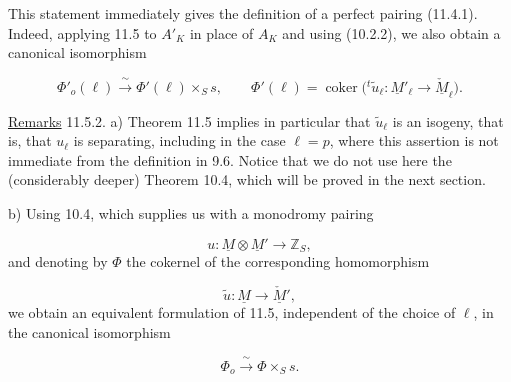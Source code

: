 This statement immediately gives the definition of a perfect pairing
(11.4.1). Indeed, applying 11.5 to $A'_K$ in place of $A_K$ and using
(10.2.2), we also obtain a canonical isomorphism

\begin{equation*}
\Phi'_o(\ell)\xrightarrow{\ \sim\ }\Phi'(\ell)\times_S s,
\qquad
\Phi'(\ell)=\operatorname{coker}\bigl(
 {}^t\!\widetilde u_\ell:\underline M'_\ell
 \longrightarrow\underline{\check M}_\ell\bigr).
\end{equation*}

\medskip
\noindent
\underline{Remarks} 11.5.2. a) Theorem 11.5 implies in particular that
$\widetilde u_\ell$ is an isogeny, that is, that $u_\ell$ is
separating, including in the case $\ell=p$, where this assertion is not
immediate from the definition in 9.6. Notice that we do not use here
the (considerably deeper) Theorem 10.4, which will be proved in the next
section.

\smallskip
\noindent
b) Using 10.4, which supplies us with a monodromy pairing

\begin{equation*}
u:\underline M\otimes\underline M'\longrightarrow\mathbb Z_S,
\end{equation*}
and denoting by $\Phi$ the cokernel of the corresponding homomorphism

\begin{equation*}
\widetilde u:\underline M\longrightarrow\underline{\check M}',
\end{equation*}
we obtain an equivalent formulation of 11.5, independent of the choice
of $\ell$, in the canonical isomorphism

\begin{equation}\tag{11.5.3}
\Phi_o\xrightarrow{\ \sim\ }\Phi\times_S s.
\end{equation}
